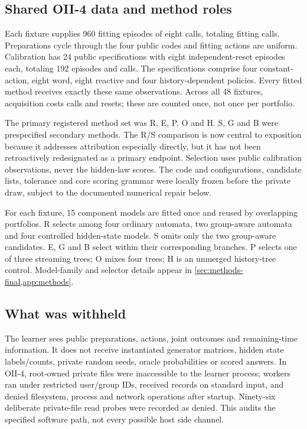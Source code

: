 

\subsection{Shared OII-4 data and method roles}\label{p3:c20}
Each fixture supplies 960 fitting episodes of eight calls, totaling \TrainCalls{} fitting calls. Preparations cycle through the four public codes and fitting actions are uniform. Calibration has 24 public specifications with eight independent-reset episodes each, totaling 192 episodes and \CalibrationCalls{} calls. The specifications comprise four constant-action, eight word, eight reactive and four history-dependent policies. Every fitted method receives exactly these same observations. Across all 48 fixtures, acquisition costs \SharedCalls{} calls and \SharedResets{} resets; these are counted once, not once per portfolio.

The primary registered method set was R, E, P, O and H. S, G and B were prespecified secondary methods. The R/S comparison is now central to exposition because it addresses attribution especially directly, but it has not been retroactively redesignated as a primary endpoint. Selection uses public calibration observations, never the hidden-law scores. The code and configurations, candidate lists, tolerance and core scoring grammar were locally frozen before the private draw, subject to the documented numerical repair below.

For each fixture, 15 component models are fitted once and reused by overlapping portfolios. R selects among four ordinary automata, two group-aware automata and four controlled hidden-state models. S omits only the two group-aware candidates. E, G and B select within their corresponding branches. P selects one of three streaming trees; O mixes four trees; H is an unmerged history-tree control. Model-family and selector details appear in \cref{sec:methods-final,app:methods}.

\subsection{What was withheld}\label{sec:opacity}
The learner sees public preparations, actions, joint outcomes and remaining-time information. It does not receive instantiated generator matrices, hidden state labels/counts, private random seeds, oracle probabilities or scored answers. In OII-4, root-owned private files were inaccessible to the learner process; workers ran under restricted user/group IDs, received records on standard input, and denied filesystem, process and network operations after startup. Ninety-six deliberate private-file read probes were recorded as denied. This audits the specified software path, not every possible host side channel.

